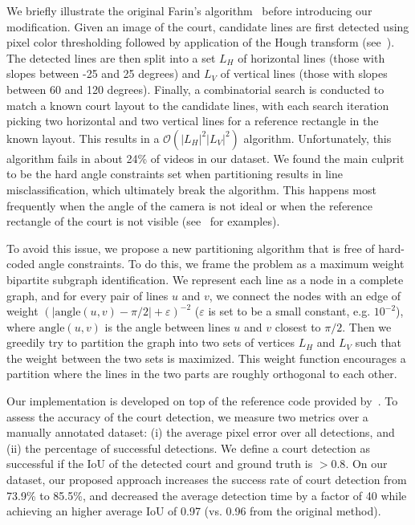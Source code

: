 We briefly illustrate the original Farin's algorithm~\cite{FKWE04} before introducing our modification. Given an image of the court, candidate lines are first detected using pixel color thresholding followed by application of the Hough transform (see~). The detected lines are then split into a set $L_H$ of horizontal lines (those with slopes between -25 and 25 degrees) and $L_V$ of vertical lines (those with slopes between 60 and 120 degrees). Finally, a combinatorial search is conducted to match a known court layout to the candidate lines, with each search iteration picking two horizontal and two vertical lines for a reference rectangle in the known layout. This results in a $\mathcal{O}(|L_H|^2|L_V|^2)$ algorithm. Unfortunately, this algorithm fails in about 24\% of videos in our dataset. We found the main culprit to be the hard angle constraints set when partitioning results in line misclassification, which ultimately break the algorithm. This happens most frequently when the angle of the camera is not ideal or when the reference rectangle of the court is not visible (see~ for examples).

To avoid this issue, we propose a new partitioning algorithm that is free of hard-coded angle constraints. To do this, we frame the problem as a maximum weight bipartite subgraph identification. We represent each line as a node in a complete graph, and for every pair of lines $u$ and $v$, we connect the nodes with an edge of weight $(|\mathrm{angle}(u, v) - \pi / 2|+ \varepsilon)^{-2}$ ($\varepsilon$ is set to be a small constant, e.g. $10^{-2}$), where $\mathrm{angle}(u, v)$ is the angle between lines $u$ and $v$ closest to $\pi / 2$. Then we greedily try to partition the graph into two sets of vertices $L_H$ and $L_V$ such that the weight between the two sets is maximized. This weight function encourages a partition where the lines in the two parts are roughly orthogonal to each other.

Our implementation is developed on top of the reference code provided by~\cite{court_detect}. To assess the accuracy of the court detection, we measure two metrics over a manually annotated dataset: (i) the average pixel error over all detections, and (ii) the percentage of successful detections. We define a court detection as successful if the IoU of the detected court and ground truth is $>0.8$. On our dataset, our proposed approach increases the success rate of court detection from 73.9\% to 85.5\%, and decreased the average detection time by a factor of 40 while achieving an higher average IoU of 0.97 (vs. 0.96 from the original method).

